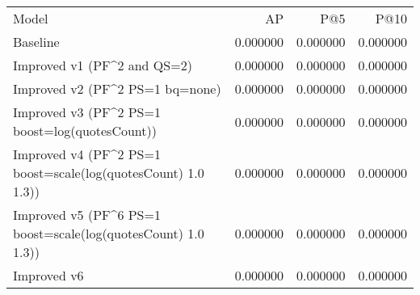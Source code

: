\begin{tabular}{lrrr}
Model & AP & P@5 & P@10 \\
Baseline & 0.000000 & 0.000000 & 0.000000 \\
Improved v1 (PF^2 and QS=2) & 0.000000 & 0.000000 & 0.000000 \\
Improved v2 (PF^2 PS=1 bq=none) & 0.000000 & 0.000000 & 0.000000 \\
Improved v3 (PF^2 PS=1 boost=log(quotesCount)) & 0.000000 & 0.000000 & 0.000000 \\
Improved v4 (PF^2 PS=1 boost=scale(log(quotesCount) 1.0 1.3)) & 0.000000 & 0.000000 & 0.000000 \\
Improved v5 (PF^6 PS=1 boost=scale(log(quotesCount) 1.0 1.3)) & 0.000000 & 0.000000 & 0.000000 \\
Improved v6 & 0.000000 & 0.000000 & 0.000000 \\
\end{tabular}
